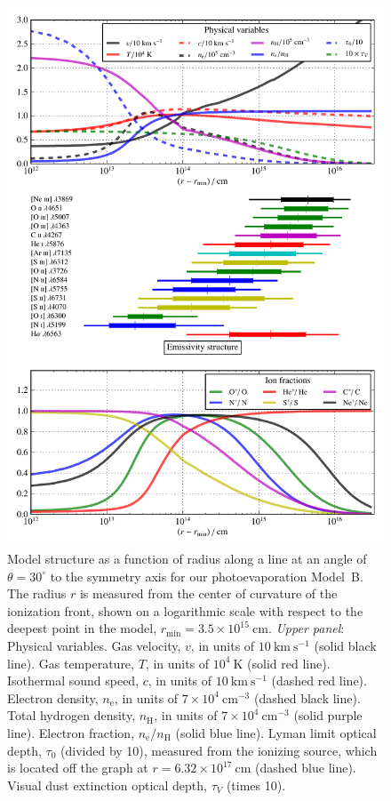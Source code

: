 \documentclass[useAMS,usenatbib]{mn2e}
\begin{document}
\begin{figure}
  \includegraphics[width=0.7\linewidth]{model-structure-hst10-th30}
  \caption{%
    Model structure  as a function of radius 
    along a line at an angle of \(\theta = 30^{\circ}\) to the symmetry axis 
    for our photoevaporation Model~B.
    The radius \(r\) is measured from the center of curvature of the ionization front, 
    shown on a logarithmic scale with respect to the deepest point in the model, 
    \(r_{\mathrm{min}} = 3.5 \times 10^{15}\ \mathrm{cm}\).
    \textit{Upper panel}: Physical variables. 
    Gas velocity, \(v\), in units of \(10\ \mathrm{km~s^{-1}}\) (solid black line).
    Gas temperature, \(T\), in units of \(10^4\ \mathrm{K}\) (solid red line).
    Isothermal sound speed, \(c\), in units of  \(10\ \mathrm{km~s^{-1}}\) (dashed red line).
    Electron density, \(n_{\mathrm{e}}\), in units of \(7 \times 10^4\ \mathrm{cm^{-3}}\) (dashed black line).
    Total hydrogen density, \(n_{\mathrm{H}}\), in units of  \(7 \times 10^4\ \mathrm{cm^{-3}}\) (solid purple line).
    Electron fraction, \(n_{\mathrm{e}}/n_{\mathrm{H}}\) (solid blue line).
    Lyman limit optical depth, \(\tau_0\) (divided by 10), measured from the ionizing source, 
    which is located off the graph at \(r =  6.32 \times 10^{17}\ \mathrm{cm}\) (dashed blue line).
    Visual dust extinction optical depth, \(\tau_V\) (times 10). 
}
\end{figure}
\end{document}
